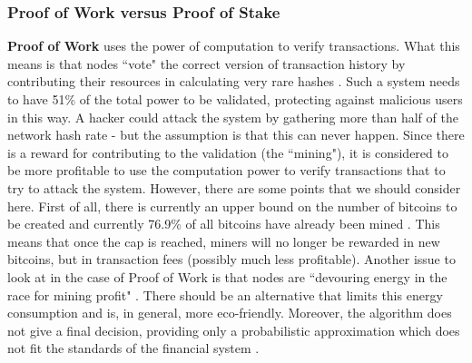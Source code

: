 \documentclass[12pt,twoside]{article}
\begin{document}
\subsubsection{Proof of Work versus Proof of Stake}
\label{sub:powpos}
\textbf{Proof of Work} uses the power of computation to verify transactions. What this means is that nodes ``vote" the correct version of transaction history by contributing their resources in calculating very rare hashes \cite{PWPS}. Such a system needs to have 51\% of the total power to be validated, protecting against malicious users in this way. A hacker could attack the system by gathering more than half of the network hash rate - but the assumption is that this can never happen. Since there is a reward for contributing to the validation (the ``mining"), it is considered to be more profitable to use the computation power to verify transactions that to try to attack the system. However, there are some points that we should consider here. First of all, there is currently an upper bound on the number of bitcoins to be created and currently 76.9\% of all bitcoins have already been mined \cite{BC:UB}. This means that once the cap is reached, miners will no longer be rewarded in new bitcoins, but in transaction fees (possibly much less profitable). Another issue to look at in the case of Proof of Work is that nodes are ``devouring energy in the race for mining profit" \cite{PoW}. There should be an alternative that limits this energy consumption and is, in general, more eco-friendly. Moreover, the algorithm does not give a final decision, providing only a probabilistic approximation which does not fit the standards of the financial system \cite{Corda:TP}.
\\ \\
\end{document}

